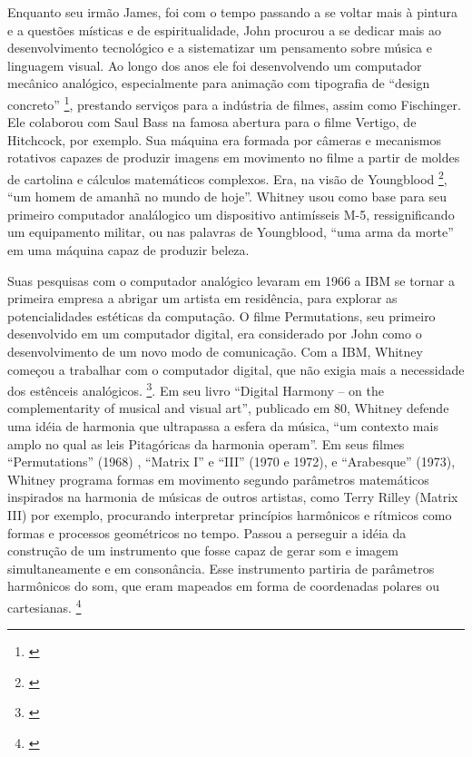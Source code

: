 Enquanto seu irmão James, foi com o tempo passando a se voltar mais à pintura e a questões místicas e de espiritualidade, John procurou a se dedicar mais ao desenvolvimento tecnológico e a sistematizar um pensamento sobre música e linguagem visual. Ao longo dos anos ele foi desenvolvendo um computador mecânico analógico, especialmente para animação com tipografia de ``design concreto'' \footnote{\cite{Youngblood1970}}, prestando serviços para a indústria de filmes, assim como Fischinger. Ele colaborou com Saul Bass na famosa abertura para o filme Vertigo, de Hitchcock, por exemplo. Sua máquina era formada por câmeras e mecanismos rotativos capazes de produzir imagens em movimento no filme a partir de moldes de cartolina e cálculos matemáticos complexos. Era, na visão de Youngblood \footnote{\cite{Youngblood1970}}, ``um homem de amanhã no mundo de hoje''. Whitney usou como base para seu primeiro computador analálogico um dispositivo antimísseis M-5, ressignificando um equipamento militar, ou nas palavras de Youngblood, ``uma arma da morte'' em uma máquina capaz de produzir beleza.

Suas pesquisas com o computador analógico levaram em 1966 a IBM se tornar a primeira empresa a abrigar um artista em residência, para explorar as potencialidades estéticas da computação. O filme Permutations, seu primeiro desenvolvido em um computador digital, era considerado por John como o desenvolvimento de um novo modo de comunicação. Com a IBM, Whitney começou a trabalhar com o computador digital, que não exigia mais a necessidade dos estênceis analógicos. \footnote{\cite{Youngblood1970}}. 
Em seu livro ``Digital Harmony – on the complementarity of musical and visual art'', publicado em 80, Whitney defende uma idéia de harmonia que ultrapassa a esfera da música, ``um contexto mais amplo no qual as leis Pitagóricas da harmonia operam''. Em seus filmes ``Permutations'' (1968) , ``Matrix I'' e ``III'' (1970 e 1972), e ``Arabesque'' (1973), Whitney programa formas em movimento segundo parâmetros matemáticos inspirados na harmonia de músicas de outros artistas, como Terry Rilley (Matrix III) por exemplo, procurando interpretar princípios harmônicos e rítmicos como formas e processos geométricos no tempo. Passou a perseguir a idéia da construção de um instrumento que fosse capaz de gerar som e imagem simultaneamente e em consonância. Esse instrumento partiria de parâmetros harmônicos do som, que eram mapeados em forma de coordenadas polares ou cartesianas. \footnote{\cite{Whitney1980}}

